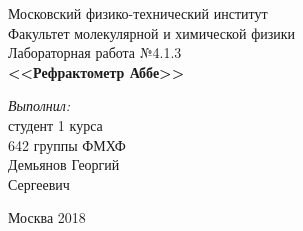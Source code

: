 \begin{titlepage}
\begin{center} 
 
\large Московский физико-технический институт\\
Факультет молекулярной и химической физики\\
\vspace{7cm}
\huge Лабораторная работа №4.1.3\\
\textbf{\Large <<Рефрактометр Аббе>>}\\
\end{center} 

\vspace{7.5cm}
{\par \raggedleft \large \emph{Выполнил:}\\ студент 1 курса\\ 642 группы ФМХФ\\ Демьянов Георгий\\ Сергеевич \par}
\begin{center}
\vfill Москва 2018
\end{center}
\end{titlepage}
\newpage
